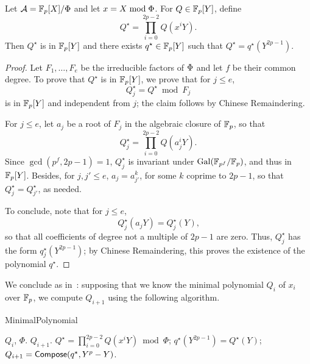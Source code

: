\begin{lemma}
  \label{lemma:poly-cyclic}
  Let $\mathcal{A}=\mathbb{F}_p[X]/\Phi$ and let $x = X \bmod \Phi$. For
  $Q\in\mathbb{F}_p[Y]$, define 
  \begin{equation}
    \label{eq:73}
    Q^\star = \prod_{i=0}^{2p-2}Q(x^iY)
    \text{.}    
  \end{equation}
  Then $Q^\star$ is in $\mathbb{F}_p[Y]$ and there exists $q^\star\in\mathbb{F}_p[Y]$
  such that $Q^\star = q^\star(Y^{2p-1})$.
\end{lemma}
\begin{proof}
  Let $F_1,\dots,F_e$ be the irreducible factors of $\Phi$ and let
  $f$ be their common degree. To prove that $Q^\star$ is in $\mathbb{F}_p[Y]$,
  we prove that for $j \le e$, 
  \begin{equation}
    \label{eq:74}
    Q^\star_j = Q^\star \bmod F_j    
  \end{equation}
  is in $\mathbb{F}_p[Y]$ and independent from $j$; the claim follows by
  Chinese Remaindering.

  For $j \le e$, let $a_j$ be a root of $F_j$ in the algebraic closure
  of $\mathbb{F}_p$, so that
  \begin{equation}
    \label{eq:75}
    Q^\star_j = \prod_{i=0}^{2p-2}Q(a_j^iY)
    \text{.}
  \end{equation}
  Since $\gcd(p^f,2p-1)=1$, $Q^\star_j$ is invariant under ${\rm
    Gal}(\mathbb{F}_{p^f}/\mathbb{F}_p)$, and thus in $\mathbb{F}_p[Y]$. Besides, for $j,j'\le
  e$, $a_j = a_{j'}^k$, for some $k$ coprime to $2p-1$, so that
  $Q^\star_j= Q^\star_{j'}$, as needed.

  To conclude, note that for $j \le e$,
  \begin{equation}
    \label{eq:76}
    Q^\star_j(a_jY)=Q^\star_j(Y)
    \text{,}    
  \end{equation}
  so that all coefficients of degree not a multiple of $2p-1$ are
  zero.  Thus, $Q^\star_j$ has the form $q^\star_j(Y^{2p-1})$; by
  Chinese Remaindering, this proves the existence of the polynomial
  $q^\star$.
\end{proof}


We conclude as in~\cite{cantor89}: supposing that we know the minimal
polynomial $Q_i$ of $x_i$ over $\mathbb{F}_p$, we compute $Q_{i+1}$ using the
following algorithm.

\begin{algorithm}
  \caption{MinimalPolynomial}
  \begin{algorithmic}[1]
    \REQUIRE $Q_i$, $\Phi$.
    \ENSURE $Q_{i+1}$.
    \STATE \label{alg:minpol-Qstar}$Q^\star = \prod_{i=0}^{2p-2}Q(x^iY) \bmod \Phi$;
    \STATE \label{alg:minpol-qstar}$q^\star(Y^{2p-1}) = Q^\star(Y)$;
    \STATE \label{alg:minpol-Q}$Q_{i+1} = {\sf Compose}(q^\star,Y^p-Y)$.
  \end{algorithmic}
\end{algorithm}



